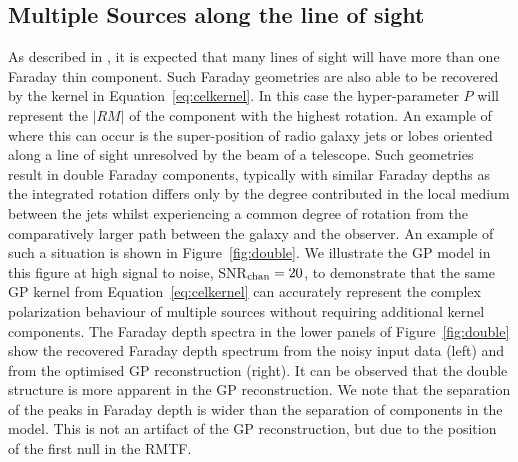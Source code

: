 \documentclass[fleqn,usenatbib]{mnras}
\begin{document}
\subsection{Multiple Sources along the line of sight}
\label{sec:multiple}

As described in \cite{Sun_2015}, it is expected that many lines of sight will have more than one Faraday thin component. Such Faraday geometries are also able to be recovered by the kernel in Equation~\ref{eq:celkernel}. In this case the hyper-parameter $P$ will represent the $|RM|$ of the component with the highest rotation. An example of where this can occur is the super-position of radio galaxy jets or lobes oriented along a line of sight unresolved by the beam of a telescope. Such geometries result in double Faraday components, typically with similar Faraday depths as the integrated rotation differs only by the degree contributed in the local medium between the jets whilst experiencing a common degree of rotation from the comparatively larger path between the galaxy and the observer. An example of such a situation is shown in Figure~\ref{fig:double}. We illustrate the GP model in this figure at high signal to noise, SNR$_{\rm chan} = 20$, to demonstrate that the same GP kernel from Equation~\ref{eq:celkernel} can accurately represent the complex polarization behaviour of multiple sources without requiring additional kernel components. The Faraday depth spectra in the lower panels of Figure~\ref{fig:double} show the recovered Faraday depth spectrum from the noisy input data (left) and from the optimised GP reconstruction (right). It can be observed that the double structure is more apparent in the GP reconstruction. We note that the separation of the peaks in Faraday depth is wider than the separation of components in the model. This is not an artifact of the GP reconstruction, but due to the position of the first null in the RMTF.
%
\end{document}

